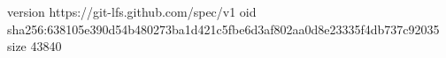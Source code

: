 version https://git-lfs.github.com/spec/v1
oid sha256:638105e390d54b480273ba1d421c5fbe6d3af802aa0d8e23335f4db737c92035
size 43840
